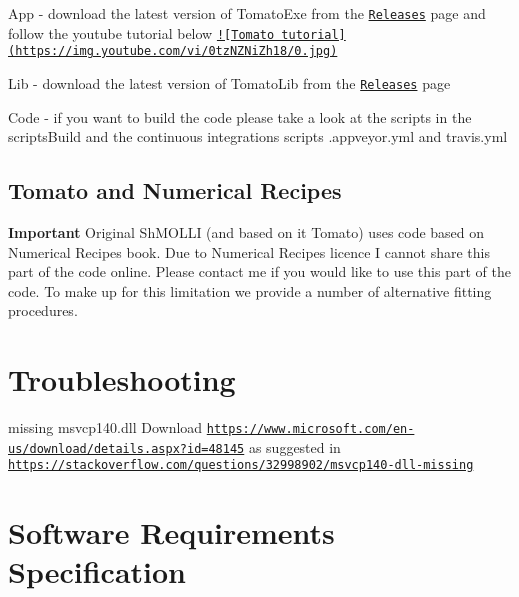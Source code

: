 \begin{DoxyItemize}
\item App -\/ download the latest version of {\ttfamily Tomato\-Exe} from the \href{https://github.com/MRKonrad/tomato/releases}{\tt Releases} page and follow the youtube tutorial below \href{https://www.youtube.com/watch?v=0tzNZNiZh18}{\tt !\mbox{[}Tomato tutorial\mbox{]}(https\-://img.\-youtube.\-com/vi/0tz\-N\-Z\-Ni\-Zh18/0.\-jpg)}
\item Lib -\/ download the latest version of {\ttfamily Tomato\-Lib} from the \href{https://github.com/MRKonrad/tomato/releases}{\tt Releases} page
\item Code -\/ if you want to build the code please take a look at the scripts in the {\ttfamily scripts\-Build} and the continuous integrations scripts {\ttfamily .appveyor.\-yml} and {\ttfamily travis.\-yml}
\end{DoxyItemize}

\subsection*{Tomato and Numerical Recipes}

{\bfseries Important} Original Sh\-M\-O\-L\-L\-I (and based on it Tomato) uses code based on Numerical Recipes book. Due to Numerical Recipes licence I cannot share this part of the code online. Please contact me if you would like to use this part of the code. To make up for this limitation we provide a number of alternative fitting procedures.

\section*{Troubleshooting}


\begin{DoxyItemize}
\item missing msvcp140.\-dll Download \href{https://www.microsoft.com/en-us/download/details.aspx?id=48145}{\tt https\-://www.\-microsoft.\-com/en-\/us/download/details.\-aspx?id=48145} as suggested in \href{https://stackoverflow.com/questions/32998902/msvcp140-dll-missing}{\tt https\-://stackoverflow.\-com/questions/32998902/msvcp140-\/dll-\/missing}
\end{DoxyItemize}

\section*{Software Requirements Specification}


